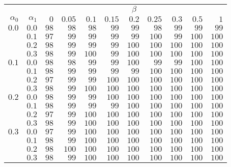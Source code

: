\begin{tabular}{rr|rrrrrrrrr}
\hline\hline
 && \multicolumn{9}{c}{$\beta$}\\
 $\alpha_0$ & $\alpha_1$ & $0$ & $0.05$ & $0.1$ & $0.15$ & $0.2$ & $0.25$ & $0.3$ & $0.5$ & $1$ \\ 
 \hline
$0.0$ & $0.0$ & $98$ & $98$ & $98$ & $99$ & $99$ & $98$ & $99$ & $99$ & $99$\\ 
 & $0.1$ & $97$ & $99$ & $99$ & $99$ & $99$ & $100$ & $99$ & $100$ & $100$\\ 
 & $0.2$ & $98$ & $99$ & $99$ & $99$ & $100$ & $100$ & $100$ & $100$ & $100$\\ 
 & $0.3$ & $98$ & $99$ & $100$ & $99$ & $100$ & $100$ & $100$ & $100$ & $100$\\ 
\hline 
 $0.1$ & $0.0$ & $98$ & $98$ & $99$ & $99$ & $100$ & $99$ & $99$ & $100$ & $100$\\ 
 & $0.1$ & $98$ & $99$ & $99$ & $99$ & $99$ & $100$ & $100$ & $100$ & $100$\\ 
 & $0.2$ & $97$ & $99$ & $99$ & $100$ & $100$ & $100$ & $100$ & $100$ & $100$\\ 
 & $0.3$ & $98$ & $99$ & $100$ & $100$ & $100$ & $100$ & $100$ & $100$ & $100$\\ 
\hline 
 $0.2$ & $0.0$ & $98$ & $99$ & $99$ & $100$ & $100$ & $100$ & $100$ & $100$ & $100$\\ 
 & $0.1$ & $98$ & $99$ & $99$ & $99$ & $100$ & $100$ & $100$ & $100$ & $100$\\ 
 & $0.2$ & $97$ & $99$ & $100$ & $100$ & $100$ & $100$ & $100$ & $100$ & $100$\\ 
 & $0.3$ & $98$ & $99$ & $100$ & $100$ & $100$ & $100$ & $100$ & $100$ & $100$\\ 
\hline 
 $0.3$ & $0.0$ & $97$ & $99$ & $100$ & $100$ & $100$ & $100$ & $100$ & $100$ & $100$\\ 
 & $0.1$ & $98$ & $99$ & $100$ & $100$ & $100$ & $100$ & $100$ & $100$ & $100$\\ 
 & $0.2$ & $98$ & $100$ & $100$ & $100$ & $100$ & $100$ & $100$ & $100$ & $100$\\ 
 & $0.3$ & $98$ & $99$ & $100$ & $100$ & $100$ & $100$ & $100$ & $100$ & $100$\\ 
 \hline 
 \end{tabular}